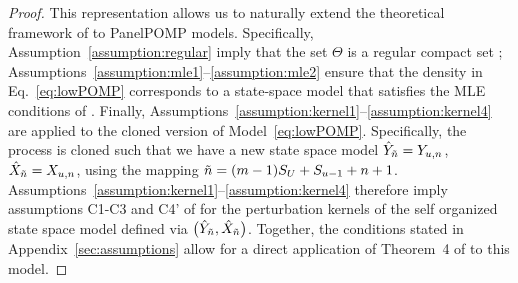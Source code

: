\begin{proof}
  This representation allows us to naturally extend the theoretical framework of \citet{chen24} to PanelPOMP models.
  Specifically, Assumption~\ref{assumption:regular} imply that the set $\Theta$ is a regular compact set \citep[See Definition~1 of][]{chen24}; Assumptions~\ref{assumption:mle1}--\ref{assumption:mle2} ensure that the density in Eq.~\ref{eq:lowPOMP} corresponds to a state-space model that satisfies the MLE conditions of \citet{chen24}. 
  Finally, Assumptions~\ref{assumption:kernel1}--\ref{assumption:kernel4} are applied to the cloned version of Model~\ref{eq:lowPOMP}. Specifically, the process is cloned such that we have a new state space model $\hat{Y}_{\tilde{n}} = Y_{u, n}$, $\hat{X}_{\tilde{n}} = X_{u, n}$, using the mapping $\tilde{n} = (m-1)S_U + S_{u-1}+n+1$.
  Assumptions~\ref{assumption:kernel1}--\ref{assumption:kernel4} therefore imply assumptions C1-C3 and C4' of \citet{chen24} for the perturbation kernels of the self organized state space model defined via $\big(\hat{Y}_{\tilde{n}}, \hat{X}_{\tilde{n}}\big)$.
  Together, the conditions stated in Appendix~\ref{sec:assumptions} allow for a direct application of Theorem~4 of \citet{chen24} to this model.
    \end{proof}

